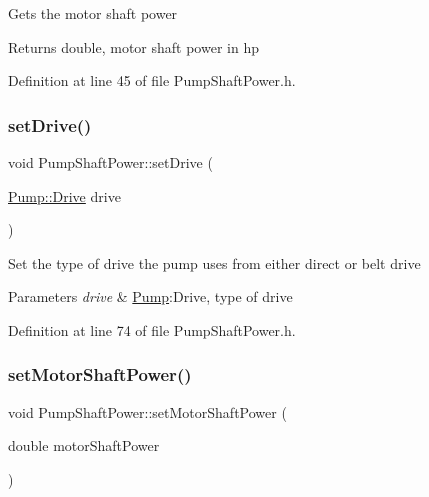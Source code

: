 Gets the motor shaft power

\begin{DoxyReturn}{Returns}
double, motor shaft power in hp 
\end{DoxyReturn}


Definition at line 45 of file Pump\+Shaft\+Power.\+h.

\mbox{\label{class_pump_shaft_power_a2c35a110c65c582a6f7d1d4c714f8187}} 
\subsubsection{\texorpdfstring{set\+Drive()}{setDrive()}}
{\footnotesize\ttfamily void Pump\+Shaft\+Power\+::set\+Drive (\begin{DoxyParamCaption}\item[{\hyperlink{class_pump_a32bf0ade131a11bb3b3fb374f638e983}{Pump\+::\+Drive}}]{drive }\end{DoxyParamCaption})\hspace{0.3cm}{\ttfamily [inline]}}

Set the type of drive the pump uses from either direct or belt drive


\begin{DoxyParams}{Parameters}
{\em drive} & \hyperlink{class_pump}{Pump}\+:Drive, type of drive \\
\hline
\end{DoxyParams}


Definition at line 74 of file Pump\+Shaft\+Power.\+h.

\mbox{\label{class_pump_shaft_power_a77b8c621c7c92841dbd00112437c413b}} 
\subsubsection{\texorpdfstring{set\+Motor\+Shaft\+Power()}{setMotorShaftPower()}}
{\footnotesize\ttfamily void Pump\+Shaft\+Power\+::set\+Motor\+Shaft\+Power (\begin{DoxyParamCaption}\item[{double}]{motor\+Shaft\+Power }\end{DoxyParamCaption})\hspace{0.3cm}{\ttfamily [inline]}}

